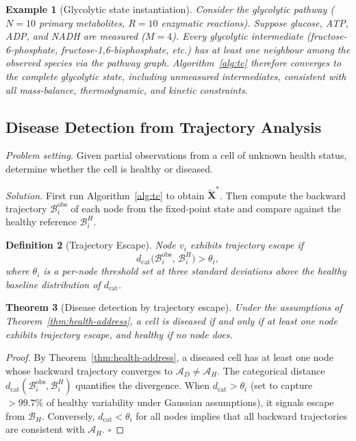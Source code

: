 \documentclass[twocolumn,10pt,a4paper]{article}
\newcommand{\dcat}{d_{\mathrm{cat}}}
\newcommand{\Back}{\mathcal{B}}
\newtheorem{theorem}{Theorem}[section]
\newtheorem{definition}[theorem]{Definition}
\newtheorem{example}[theorem]{Example}
\begin{document}
\begin{example}[Glycolytic state instantiation]
\label{ex:glycolysis}
Consider the glycolytic pathway ($N=10$ primary metabolites,
$R=10$ enzymatic reactions).  Suppose glucose, ATP, ADP, and NADH are
measured ($M=4$).  Every glycolytic intermediate (fructose-6-phosphate,
fructose-1,6-bisphosphate, etc.) has at least one neighbour among the observed
species via the pathway graph.  Algorithm~\ref{alg:tc} therefore converges to
the complete glycolytic state, including unmeasured intermediates, consistent
with all mass-balance, thermodynamic, and kinetic constraints.
\end{example}

\subsection{Disease Detection from Trajectory Analysis}
\label{sec:app-disease}

\emph{Problem setting.}  Given partial observations from a cell of unknown
health status, determine whether the cell is healthy or diseased.

\emph{Solution.}  First run Algorithm~\ref{alg:tc} to obtain
$\widetilde{\mathbf{X}}^*$.  Then compute the backward trajectory
$\Back_i^{\mathrm{obs}}$ of each node from the fixed-point state and compare
against the healthy reference $\Back_i^H$.

\begin{definition}[Trajectory Escape]
\label{def:traj-escape}
Node $v_i$ exhibits \emph{trajectory escape} if
\begin{equation}
  \dcat\bigl(\Back_i^{\mathrm{obs}},\,\Back_i^H\bigr) > \theta_i,
  \label{eq:escape}
\end{equation}
where $\theta_i$ is a per-node threshold set at three standard deviations above
the healthy baseline distribution of $\dcat$.
\end{definition}

\begin{theorem}[Disease detection by trajectory escape]
\label{thm:disease-detect}
Under the assumptions of Theorem~\ref{thm:health-address}, a cell is diseased
if and only if at least one node exhibits trajectory escape, and healthy if no
node does.
\end{theorem}

\begin{proof}
By Theorem~\ref{thm:health-address}, a diseased cell has at least one node
whose backward trajectory converges to $\mathcal{A}_D\neq\mathcal{A}_H$.  The
categorical distance $\dcat(\Back_i^{\mathrm{obs}},\Back_i^H)$ quantifies the
divergence.  When $\dcat>\theta_i$ (set to capture $>99.7\%$ of healthy
variability under Gaussian assumptions), it signals escape from $\mathcal{B}_H$.
Conversely, $\dcat<\theta_i$ for all nodes implies that all backward
trajectories are consistent with $\mathcal{A}_H$.  $\square$
\end{proof}
\end{document}
